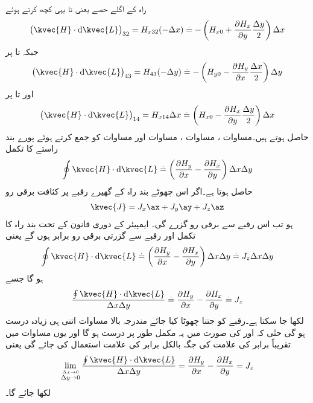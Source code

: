 راہ کے اگلے حصے یعنی  تا  یہی کچھ کرتے ہوئے
\begin{align}\label{مساوات_مقناطیسی_پہلے_حصہ_تکمل_ب}
\left( \kvec{H} \cdot \dif \kvec{L}\right)_{32}=H_{x32}(-\Delta x) \overset{.}{=}-\left(H_{x0}+\frac{\partial H_x}{\partial y} \frac{\Delta y}{2} \right)\Delta x 
\end{align}
جبکہ  تا  پر
\begin{align}\label{مساوات_مقناطیسی_پہلے_حصہ_تکمل_پ}
\left( \kvec{H} \cdot \dif \kvec{L}\right)_{43}=H_{43}(-\Delta y)\overset{.}{=}-\left(H_{y0}-\frac{\partial H_y}{\partial x} \frac{\Delta x}{2} \right)\Delta y 
\end{align}
اور  تا  پر
\begin{align}\label{مساوات_مقناطیسی_پہلے_حصہ_تکمل_ت}
\left( \kvec{H} \cdot \dif \kvec{L}\right)_{14}=H_{x14}\Delta x \overset{.}{=}\left(H_{x0}-\frac{\partial H_x}{\partial y} \frac{\Delta y}{2} \right)\Delta x 
\end{align}
حاصل ہوتے ہیں۔مساوات  ، مساوات ، مساوات  اور مساوات  کو جمع کرتے ہوئے پورے بند راستے کا تکمل
\begin{align}
\oint \kvec{H} \cdot \dif \kvec{L}\overset{.}{=}\left(\frac{\partial H_y}{\partial x}-\frac{\partial H_x}{\partial y} \right)\Delta x \Delta y
\end{align}
حاصل ہوتا ہے۔اگر اس چھوٹے بند راہ کے گھیرے رقبے پر کثافت برقی رو
\begin{align*}
\kvec{J}=J_x \ax+J_y\ay+J_z \az
\end{align*}
ہو تب اس رقبے سے  برقی رو گزرے گی۔ ایمپیئر کے دوری قانون کے تحت بند راہ کا تکمل اور رقبے سے گزرتی برقی رو برابر ہوں گے یعنی
\begin{align*}
\oint \kvec{H} \cdot \dif \kvec{L}\overset{.}{=}\left(\frac{\partial H_y}{\partial x}-\frac{\partial H_x}{\partial y} \right)\Delta x \Delta y\overset{.}{=}J_z \Delta x \Delta y
\end{align*}
ہو گا جسے
\begin{align*}
\frac{\oint \kvec{H} \cdot \dif \kvec{L}}{\Delta x \Delta y}\overset{.}{=}\frac{\partial H_y}{\partial x}-\frac{\partial H_x}{\partial y}\overset{.}{=}J_z
\end{align*}
لکھا جا سکتا ہے۔رقبے کو جتنا چھوٹا کیا جائے مندرجہ بالا مساوات اتنی ہی زیادہ درست ہو گی حتٰی کہ  اور  کی صورت میں یہ مکمل طور پر درست ہو گا اور یوں مساوات میں تقریباً برابر کی علامت  کی جگہ بالکل برابر  کی علامت استعمال کی جائے گی یعنی
\begin{align}\label{مساوات_مقناطیسی_گردش_الف}
\lim_{\overset{\Delta x \to 0}{\Delta y \to 0}}\frac{\oint \kvec{H} \cdot \dif \kvec{L}}{\Delta x \Delta y}=\frac{\partial H_y}{\partial x}-\frac{\partial H_x}{\partial y}=J_z
\end{align}
لکھا جائے گا۔

